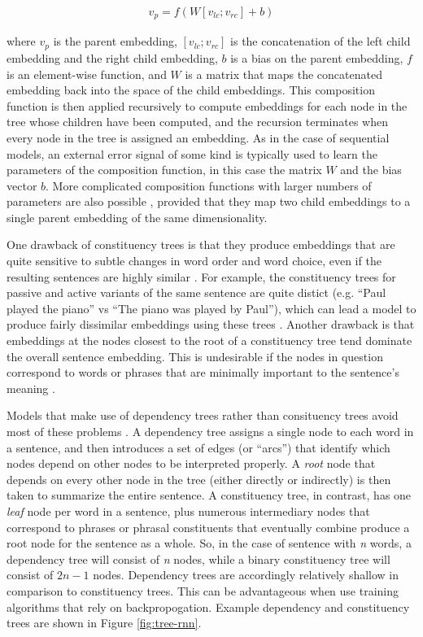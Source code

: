 \begin{align} 
\label{eqn:ct_rnn}
v_p = f (W [v_{lc}; v_{rc}] + b)
\end{align}

\noindent
where $v_p$ is the parent embedding, $[v_{lc}; v_{rc}]$ is the concatenation of the left child embedding and the right child embedding, $b$ is a bias on the parent embedding, $f$ is an element-wise function, and $W$ is a matrix that maps the concatenated embedding back into the space of the child embeddings. This composition function is then applied recursively to compute embeddings for each node in the tree whose children have been computed, and the recursion terminates when every node in the tree is assigned an embedding. As in the case of sequential models, an external error signal of some kind is typically used to learn the parameters of the composition function, in this case the matrix $W$ and the bias vector $b$. More complicated composition functions with larger numbers of parameters are also possible \citep[e.g.][]{Tai:2015,Socher:2012}, provided that they map two child embeddings to a single parent embedding of the same dimensionality. 

One drawback of constituency trees is that they produce embeddings that are quite sensitive to subtle changes in word order and word choice, even if the resulting sentences are highly similar \citep{Socher:2014,Iyyer:2014}. For example, the constituency trees for passive and active variants of the same sentence are quite distict (e.g. ``Paul played the piano'' vs ``The piano was played by Paul''), which can lead a model to produce fairly dissimilar embeddings using these trees \citep{Socher:2014}. Another drawback is that embeddings at the nodes closest to the root of a constituency tree tend dominate the overall sentence embedding. This is undesirable if the nodes in question correspond to words or phrases that are minimally important to the sentence's meaning \citep{Socher:2014}.

Models that make use of dependency trees rather than consituency trees avoid most of these problems \citep{Socher:2014}. A dependency tree assigns a single node to each word in a sentence, and then introduces a set of edges (or ``arcs'') that identify which nodes depend on other nodes to be interpreted properly. A \textit{root} node that depends on every other node in the tree (either directly or indirectly) is then taken to summarize the entire sentence. A constituency tree, in contrast, has one \textit{leaf} node per word in a sentence, plus numerous intermediary nodes that correspond to phrases or phrasal constituents that eventually combine produce a root node for the sentence as a whole. So, in the case of sentence with \textit{n} words, a dependency tree will consist of \textit{n} nodes, while a binary constituency tree will consist of $2n - 1$ nodes. Dependency trees are accordingly relatively shallow in comparison to constituency trees. This can be advantageous when use training algorithms that rely on backpropogation. Example dependency and constituency trees are shown in Figure \ref{fig:tree-rnn}. 

